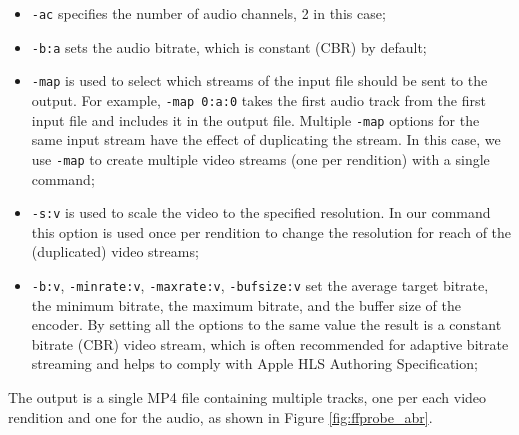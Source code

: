 \begin{itemize}
    \item \texttt{-ac} specifies the number of audio channels, 2 in this case;
    \item \texttt{-b:a} sets the audio bitrate, which is constant (CBR) by default;
    \item \texttt{-map} is used to select which streams of the input file should be sent to the output. For example, \texttt{-map 0:a:0} takes the first audio track from the first input file and includes it in the output file. Multiple \texttt{-map} options for the same input stream have the effect of duplicating the stream. In this case, we use \texttt{-map} to create multiple video streams (one per rendition) with a single command;
    \item \texttt{-s:v} is used to scale the video to the specified resolution. In our command this option is used once per rendition to change the resolution for reach of the (duplicated) video streams;
    \item \texttt{-b:v}, \texttt{-minrate:v}, \texttt{-maxrate:v}, \texttt{-bufsize:v} set the average target bitrate, the minimum bitrate, the maximum bitrate, and the buffer size of the encoder. By setting all the options to the same value the result is a constant bitrate (CBR) video stream, which is often recommended for adaptive bitrate streaming and helps to comply with Apple HLS Authoring Specification;\cite{ozer}\cite{hlsauthoring}
\end{itemize}

The output is a single MP4 file containing multiple tracks, one per each video rendition and one for the audio, as shown in Figure \ref{fig:ffprobe_abr}.

